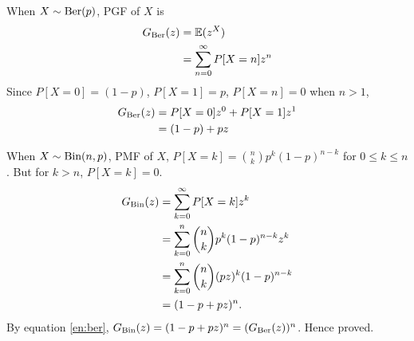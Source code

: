 \begin{solution}
	When $X\sim\text{Ber}(p)$, PGF of $X$ is
	\begin{align}
		G_{\text{Ber}}(z) & = \mathbb{E}(z^X)                     \\
		          & = \sum_{n=0}^\infty P[X=n]z^n
	\end{align}
	Since $P[X=0]=(1-p)$, $P[X=1] = p$, $P[X=n]=0$ when $n>1$,
	\begin{align}
		G_{\text{Ber}}(z) & = P[X=0]z^0 + P[X=1]z^1 \\
		          & = (1-p) + pz
		\label{en:ber}
	\end{align}

	When $X\sim\text{Bin}(n,p)$, PMF of $X$, $P[X=k] = \binom{n}{k}p^k(1-p)^{n-k}$ for $0\leq
		k\leq n$. But for $k>n$, $P[X=k]=0$.
	\begin{align}
		G_{\text{Bin}}(z) & = \sum_{k=0}^\infty P[X=k]z^k                \\
		          & = \sum_{k=0}^n \binom{n}{k}p^k(1-p)^{n-k}z^k \\
		          & = \sum_{k=0}^n \binom{n}{k}(pz)^k(1-p)^{n-k} \\
		          & = (1-p + pz)^n.
	\end{align}
	By equation \ref{en:ber}, $G_{\text{Bin}}(z) = (1-p + pz)^n = (G_{\text{Ber}}(z))^n$.
	Hence proved.
\end{solution}
